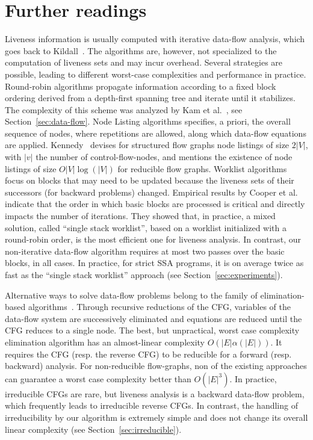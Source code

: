 \section{Further readings}
\label{sec:liveness:further}
Liveness information is usually computed with iterative
data-flow analysis, which goes back to Kildall~\cite{K73}. The algorithms are,
however, not specialized to the computation of liveness sets and may
incur overhead. Several strategies are possible, leading to
different worst-case complexities and performance in practice. Round-robin algorithms
propagate information according to a fixed block ordering derived from a
depth-first spanning tree and iterate until it stabilizes.  The complexity of
this scheme was analyzed by Kam et al.~\cite{KU76}, see
Section~\ref{sec:data-flow}.  
Node Listing algorithms specifies, a priori, the overall sequence of nodes, where repetitions are allowed, along which data-flow equations are applied. Kennedy~\cite{Kennedy75} devises for structured flow graphs node listings of size $2|V|$, with $|v|$ the number of control-flow-nodes, and mentions the existence of node listings of size $O|V| \log(|V|)$ for reducible flow graphs.
Worklist algorithms focus on blocks that may need
to be updated because the liveness sets of their successors (for
backward problems) changed.
Empirical results by Cooper et al.~\cite{CHK06} indicate that the order in
which basic blocks are processed is critical and directly impacts the number of
iterations. They showed that, in practice, a mixed solution, called ``single
stack worklist'', based on a worklist initialized with a round-robin order, is
the most efficient one  for liveness analysis. In contrast, our
non-iterative data-flow algorithm requires at most two passes over the basic
blocks, in all cases. In practice, for strict SSA programs, it is on
average twice as fast as the ``single stack worklist'' approach (see
Section~\ref{sec:experiments}).

Alternative ways to solve data-flow problems belong to the family of elimination-based algorithms~\cite{RyderP86}. Through recursive reductions of the 
CFG, variables of the data-flow system are successively eliminated and equations are reduced until the CFG reduces to a single node. 
The best, but unpractical, worst case complexity elimination algorithm has an almost-linear complexity $O(|E|\alpha(|E|))$. 
It requires the CFG (resp. the reverse CFG) to be reducible for a forward (resp.  backward) analysis.
For non-reducible flow-graphs, non of the existing approaches can guarantee a worst case complexity better than $O(|E|^3)$.
In practice, irreducible CFGs are rare, but liveness
analysis is a backward data-flow problem, which frequently leads to
irreducible reverse CFGs. In contrast, the handling of irreducibility by our algorithm is extremely simple and does not change its overall linear complexity (see Section~\ref{sec:irreducible}).

